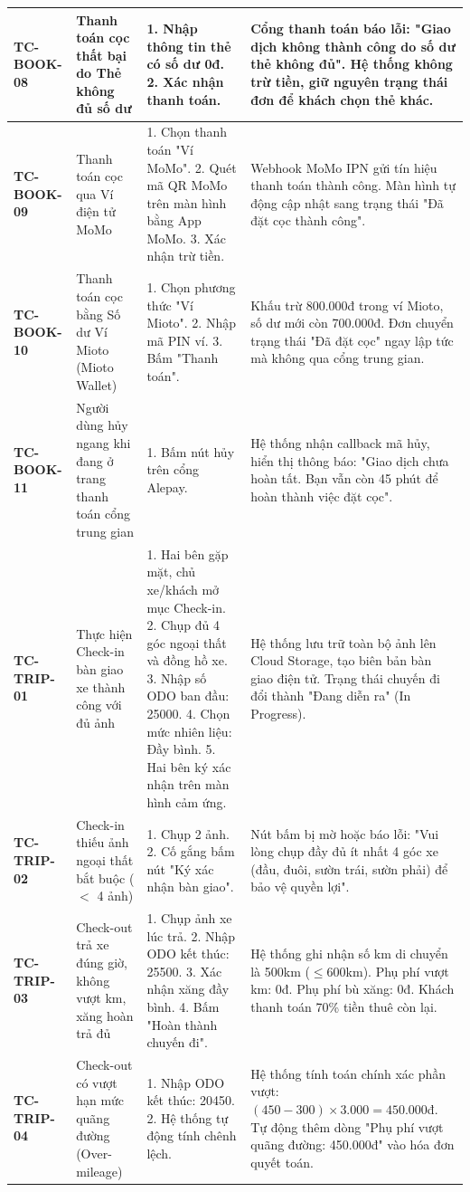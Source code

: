 {\begin{longtable}{p{2.3cm}p{3.8cm}p{4.8cm}p{4.2cm}}
\textbf{TC-BOOK-08} & Thanh toán cọc thất bại do Thẻ không đủ số dư & 1. Nhập thông tin thẻ có số dư 0đ. 2. Xác nhận thanh toán. & Cổng thanh toán báo lỗi: "Giao dịch không thành công do số dư thẻ không đủ". Hệ thống không trừ tiền, giữ nguyên trạng thái đơn để khách chọn thẻ khác. \\ \midrule
\textbf{TC-BOOK-09} & Thanh toán cọc qua Ví điện tử MoMo & 1. Chọn thanh toán "Ví MoMo". 2. Quét mã QR MoMo trên màn hình bằng App MoMo. 3. Xác nhận trừ tiền. & Webhook MoMo IPN gửi tín hiệu thanh toán thành công. Màn hình tự động cập nhật sang trạng thái "Đã đặt cọc thành công". \\ \midrule
\textbf{TC-BOOK-10} & Thanh toán cọc bằng Số dư Ví Mioto (Mioto Wallet) & 1. Chọn phương thức "Ví Mioto". 2. Nhập mã PIN ví. 3. Bấm "Thanh toán". & Khấu trừ 800.000đ trong ví Mioto, số dư mới còn 700.000đ. Đơn chuyển trạng thái "Đã đặt cọc" ngay lập tức mà không qua cổng trung gian. \\ \midrule
\textbf{TC-BOOK-11} & Người dùng hủy ngang khi đang ở trang thanh toán cổng trung gian & 1. Bấm nút hủy trên cổng Alepay. & Hệ thống nhận callback mã hủy, hiển thị thông báo: "Giao dịch chưa hoàn tất. Bạn vẫn còn 45 phút để hoàn thành việc đặt cọc". \\ \midrule
\textbf{TC-TRIP-01} & Thực hiện Check-in bàn giao xe thành công với đủ ảnh & 1. Hai bên gặp mặt, chủ xe/khách mở mục Check-in. 2. Chụp đủ 4 góc ngoại thất và đồng hồ xe. 3. Nhập số ODO ban đầu: 25000. 4. Chọn mức nhiên liệu: Đầy bình. 5. Hai bên ký xác nhận trên màn hình cảm ứng. & Hệ thống lưu trữ toàn bộ ảnh lên Cloud Storage, tạo biên bản bàn giao điện tử. Trạng thái chuyến đi đổi thành "Đang diễn ra" (In Progress). \\ \midrule
\textbf{TC-TRIP-02} & Check-in thiếu ảnh ngoại thất bắt buộc ($<$ 4 ảnh) & 1. Chụp 2 ảnh. 2. Cố gắng bấm nút "Ký xác nhận bàn giao". & Nút bấm bị mờ hoặc báo lỗi: "Vui lòng chụp đầy đủ ít nhất 4 góc xe (đầu, đuôi, sườn trái, sườn phải) để bảo vệ quyền lợi". \\ \midrule
\textbf{TC-TRIP-03} & Check-out trả xe đúng giờ, không vượt km, xăng hoàn trả đủ & 1. Chụp ảnh xe lúc trả. 2. Nhập ODO kết thúc: 25500. 3. Xác nhận xăng đầy bình. 4. Bấm "Hoàn thành chuyến đi". & Hệ thống ghi nhận số km di chuyển là 500km ($\le 600$km). Phụ phí vượt km: 0đ. Phụ phí bù xăng: 0đ. Khách thanh toán 70\% tiền thuê còn lại. \\ \midrule
\textbf{TC-TRIP-04} & Check-out có vượt hạn mức quãng đường (Over-mileage) & 1. Nhập ODO kết thúc: 20450. 2. Hệ thống tự động tính chênh lệch. & Hệ thống tính toán chính xác phần vượt: $(450 - 300) \times 3.000 = 450.000$đ. Tự động thêm dòng "Phụ phí vượt quãng đường: 450.000đ" vào hóa đơn quyết toán. \\ \midrule

\end{longtable}}
